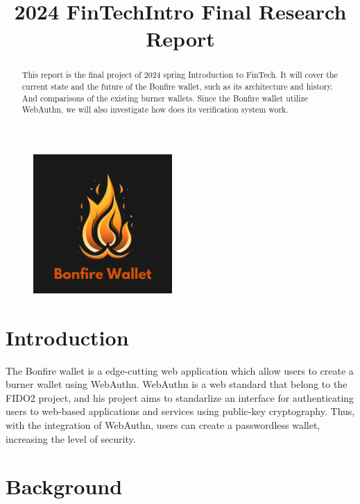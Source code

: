 \documentclass[conference]{IEEEtran}
\begin{document}
\title{2024 FinTechIntro Final Research Report\\
        }

\author{
}

\maketitle

\begin{abstract}
This report is the final project of 2024 spring Introduction to FinTech. It will cover the 
current state and the future of the Bonfire wallet, such as its architecture and history. And 
comparisons of the existing burner wallets. Since the Bonfire wallet utilize WebAuthn, we will 
also investigate how does its verification system work. 

\end{abstract}

\begin{figure}[htbp]
    \centerline{\includegraphics[width=150pt]{fig1.png}}\label{fig}
    \end{figure}


\section{Introduction}
The Bonfire wallet is a edge-cutting web application which allow users to create a burner wallet
using WebAuthn. WebAuthn is a web standard that belong to the FIDO2 project, and his project aims 
to standarlize an interface for authenticating users to web-based applications and services using 
public-key cryptography. Thus, with the integration of WebAuthn, users can create a passwordless 
wallet, increasing the level of security. 

\section{Background}
\end{document}

